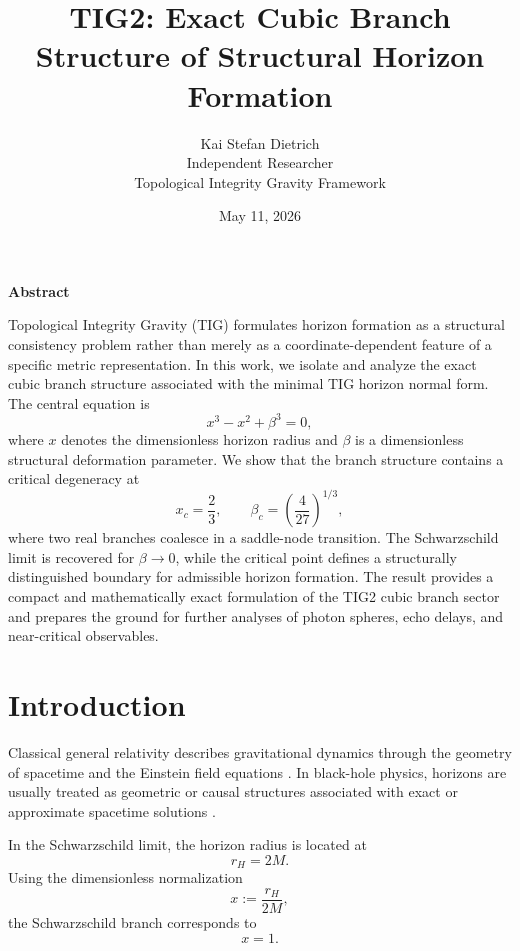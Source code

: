 \documentclass[12pt,a4paper]{article}
\title{\bfseries TIG2: Exact Cubic Branch Structure of Structural Horizon Formation}
\author{
Kai Stefan Dietrich\\
Independent Researcher\\
Topological Integrity Gravity Framework
}
\date{May 11, 2026}
\begin{document}
\maketitle
\vspace{-1.0em}

\begin{center}
\begin{minipage}{0.88\textwidth}
\begin{center}
\textbf{Abstract}
\end{center}

Topological Integrity Gravity (TIG) formulates horizon formation as a structural consistency problem rather than merely as a coordinate-dependent feature of a specific metric representation. In this work, we isolate and analyze the exact cubic branch structure associated with the minimal TIG horizon normal form. The central equation is
\[
x^3-x^2+\beta^3=0,
\]
where \(x\) denotes the dimensionless horizon radius and \(\beta\) is a dimensionless structural deformation parameter. We show that the branch structure contains a critical degeneracy at
\[
x_c=\frac{2}{3},
\qquad
\beta_c=\left(\frac{4}{27}\right)^{1/3},
\]
where two real branches coalesce in a saddle-node transition. The Schwarzschild limit is recovered for \(\beta\to0\), while the critical point defines a structurally distinguished boundary for admissible horizon formation. The result provides a compact and mathematically exact formulation of the TIG2 cubic branch sector and prepares the ground for further analyses of photon spheres, echo delays, and near-critical observables.
\end{minipage}
\end{center}

\vspace{0.5em}

\section{Introduction}

Classical general relativity describes gravitational dynamics through the geometry of spacetime and the Einstein field equations \cite{einstein1915,wald1984,carroll2004}. In black-hole physics, horizons are usually treated as geometric or causal structures associated with exact or approximate spacetime solutions \cite{hawkingellis1973,wald1984}.

In the Schwarzschild limit, the horizon radius is located at
\[
r_H=2M.
\]
Using the dimensionless normalization
\[
x:=\frac{r_H}{2M},
\]
the Schwarzschild branch corresponds to
\[
x=1.
\]
\end{document}

